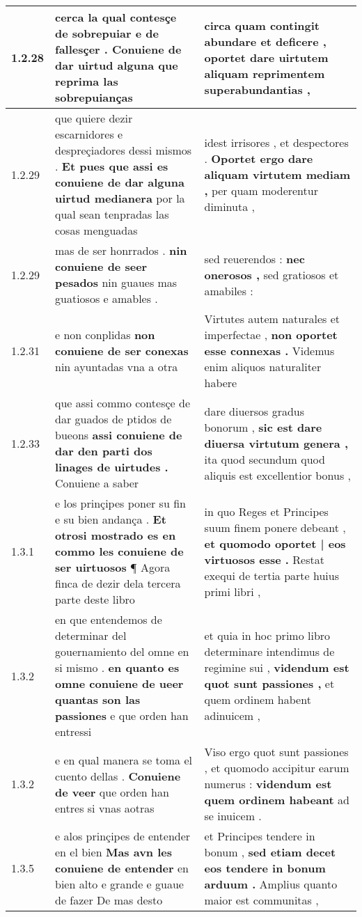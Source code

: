 \begin{tabular}{|p{1cm}|p{6.5cm}|p{6.5cm}|}
1.2.28 & cerca la qual contesçe de sobrepuiar e de fallesçer . \textbf{ Conuiene de dar uirtud alguna } que reprima las sobrepuianças & circa quam contingit abundare et deficere , \textbf{ oportet dare uirtutem } aliquam reprimentem superabundantias , \\\hline
1.2.29 & que quiere dezir escarnidores e despreçiadores dessi mismos . \textbf{ Et pues que assi es conuiene de dar alguna uirtud medianera } por la qual sean tenpradas las cosas menguadas & idest irrisores , et despectores . \textbf{ Oportet ergo dare aliquam virtutem mediam , } per quam moderentur diminuta , \\\hline
1.2.29 & mas de ser honrrados . \textbf{ nin conuiene de seer pesados } nin guaues mas guatiosos e amables . & sed reuerendos : \textbf{ nec onerosos , } sed gratiosos et amabiles : \\\hline
1.2.31 & e non conplidas \textbf{ non conuiene de ser conexas } nin ayuntadas vna a otra & Virtutes autem naturales et imperfectae , \textbf{ non oportet esse connexas . } Videmus enim aliquos naturaliter habere \\\hline
1.2.33 & que assi commo contesçe de dar guados de ptidos de bueons \textbf{ assi conuiene de dar den parti dos linages de uirtudes . } Conuiene a saber & dare diuersos gradus bonorum , \textbf{ sic est dare diuersa virtutum genera , } ita quod secundum quod aliquis est excellentior bonus , \\\hline
1.3.1 & e los prinçipes poner su fin e su bien andança . \textbf{ Et otrosi mostrado es en commo les conuiene de ser uirtuosos } ¶ Agora finca de dezir dela tercera parte deste libro & in quo Reges et Principes suum finem ponere debeant , \textbf{ et quomodo oportet | eos virtuosos esse . } Restat exequi de tertia parte huius primi libri , \\\hline
1.3.2 & en que entendemos de determinar del gouernamiento del omne en si mismo . \textbf{ en quanto es omne conuiene de ueer quantas son las passiones } e que orden han entressi & et quia in hoc primo libro determinare intendimus de regimine sui , \textbf{ videndum est quot sunt passiones , } et quem ordinem habent adinuicem , \\\hline
1.3.2 & e en qual manera se toma el cuento dellas . \textbf{ Conuiene de veer } que orden han entres si vnas aotras & Viso ergo quot sunt passiones , et quomodo accipitur earum numerus : \textbf{ videndum est quem ordinem habeant } ad se inuicem . \\\hline
1.3.5 & e alos prinçipes de entender en el bien \textbf{ Mas avn les conuiene de entender } en bien alto e grande e guaue de fazer De mas desto & et Principes tendere in bonum , \textbf{ sed etiam decet eos tendere in bonum arduum . } Amplius quanto maior est communitas , \\\hline

\end{tabular}
